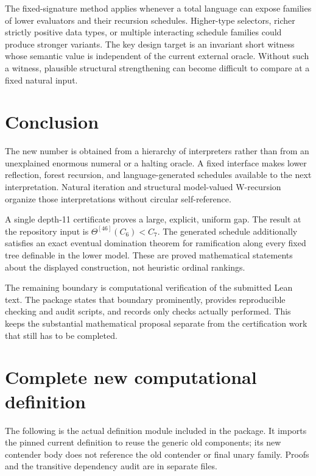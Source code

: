 \documentclass[11pt,letterpaper]{article}
\theoremstyle{definition}
\newcommand{\Iter}[2]{#1^{[#2]}}
\begin{document}
The fixed-signature method applies whenever a total language can expose
families of lower evaluators and their recursion schedules. Higher-type
selectors, richer strictly positive data types, or multiple interacting
schedule families could produce stronger variants. The key design target is
an invariant short witness whose semantic value is independent of the
current external oracle. Without such a witness, plausible structural
strengthening can become difficult to compare at a fixed natural input.

\section{Conclusion}

The new number is obtained from a hierarchy of interpreters rather than from
an unexplained enormous numeral or a halting oracle. A fixed interface makes
lower reflection, forest recursion, and language-generated schedules
available to the next interpretation. Natural iteration and structural
model-valued W-recursion organize those interpretations without circular
self-reference.

A single depth-11 certificate proves a large, explicit, uniform gap. The
result at the repository input is $\Iter\Theta{46}(C_6)<C_7$. The generated
schedule additionally satisfies an exact eventual domination theorem for
ramification along every fixed tree definable in the lower model. These are
proved mathematical statements about the displayed construction, not
heuristic ordinal rankings.

The remaining boundary is computational verification of the submitted Lean
text. The package states that boundary prominently, provides reproducible
checking and audit scripts, and records only checks actually performed. This
keeps the substantial mathematical proposal separate from the certification
work that still has to be completed.

\appendix
\section{Complete new computational definition}
\label{app:code}

The following is the actual definition module included in the package. It
imports the pinned current definition to reuse the generic old components;
its new contender body does not reference the old contender or final unary
family. Proofs and the transitive dependency audit are in separate files.
\end{document}
